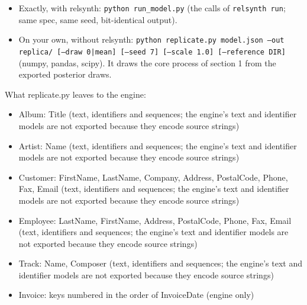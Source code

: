 \documentclass[10pt]{article}
\begin{document}
\begin{itemize}
\item Exactly, with relsynth: \texttt{python run\_model.py} (the calls of \texttt{relsynth run}; same spec, same seed, bit-identical output).
\item On your own, without relsynth: \texttt{python replicate.py model.json --out replica/ [--draw 0|mean] [--seed 7] [--scale 1.0] [--reference DIR]} (numpy, pandas, scipy).  It draws the core process of section 1 from the exported posterior draws.
\end{itemize}

What replicate.py leaves to the engine:

\begin{itemize}
\item Album: Title (text, identifiers and sequences; the engine's text and identifier models are not exported because they encode source strings)
\item Artist: Name (text, identifiers and sequences; the engine's text and identifier models are not exported because they encode source strings)
\item Customer: FirstName, LastName, Company, Address, PostalCode, Phone, Fax, Email (text, identifiers and sequences; the engine's text and identifier models are not exported because they encode source strings)
\item Employee: LastName, FirstName, Address, PostalCode, Phone, Fax, Email (text, identifiers and sequences; the engine's text and identifier models are not exported because they encode source strings)
\item Track: Name, Composer (text, identifiers and sequences; the engine's text and identifier models are not exported because they encode source strings)
\item Invoice: keys numbered in the order of InvoiceDate (engine only)
\end{itemize}
\end{document}
